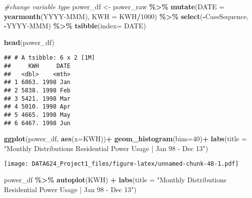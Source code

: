 \documentclass[
]{article}
\newenvironment{Shaded}{\begin{snugshade}}{\end{snugshade}}
\newcommand{\AttributeTok}[1]{\textcolor[rgb]{0.13,0.29,0.53}{#1}}
\newcommand{\CommentTok}[1]{\textcolor[rgb]{0.56,0.35,0.01}{\textit{#1}}}
\newcommand{\DecValTok}[1]{\textcolor[rgb]{0.00,0.00,0.81}{#1}}
\newcommand{\FunctionTok}[1]{\textcolor[rgb]{0.13,0.29,0.53}{\textbf{#1}}}
\newcommand{\NormalTok}[1]{#1}
\newcommand{\OtherTok}[1]{\textcolor[rgb]{0.56,0.35,0.01}{#1}}
\newcommand{\SpecialCharTok}[1]{\textcolor[rgb]{0.81,0.36,0.00}{\textbf{#1}}}
\newcommand{\StringTok}[1]{\textcolor[rgb]{0.31,0.60,0.02}{#1}}
\begin{document}
\begin{Shaded}
\begin{Highlighting}[]
\CommentTok{\#change variable type }
\NormalTok{power\_df }\OtherTok{\textless{}{-}}\NormalTok{ power\_raw }\SpecialCharTok{\%\textgreater{}\%} 
  \FunctionTok{mutate}\NormalTok{(}\AttributeTok{DATE =} \FunctionTok{yearmonth}\NormalTok{(}\StringTok{\textasciigrave{}}\AttributeTok{YYYY{-}MMM}\StringTok{\textasciigrave{}}\NormalTok{), }\AttributeTok{KWH =}\NormalTok{ KWH}\SpecialCharTok{/}\DecValTok{1000}\NormalTok{) }\SpecialCharTok{\%\textgreater{}\%}
  \FunctionTok{select}\NormalTok{(}\SpecialCharTok{{-}}\NormalTok{CaseSequence, }\SpecialCharTok{{-}}\StringTok{\textquotesingle{}YYYY{-}MMM\textquotesingle{}}\NormalTok{) }\SpecialCharTok{\%\textgreater{}\%} 
  \FunctionTok{tsibble}\NormalTok{(}\AttributeTok{index=}\NormalTok{ DATE)}
\end{Highlighting}
\end{Shaded}

\begin{Shaded}
\begin{Highlighting}[]
\FunctionTok{head}\NormalTok{(power\_df)}
\end{Highlighting}
\end{Shaded}

\begin{verbatim}
## # A tsibble: 6 x 2 [1M]
##     KWH     DATE
##   <dbl>    <mth>
## 1 6863. 1998 Jan
## 2 5838. 1998 Feb
## 3 5421. 1998 Mar
## 4 5010. 1998 Apr
## 5 4665. 1998 May
## 6 6467. 1998 Jun
\end{verbatim}

\begin{Shaded}
\begin{Highlighting}[]
\FunctionTok{ggplot}\NormalTok{(power\_df, }\FunctionTok{aes}\NormalTok{(}\AttributeTok{x=}\NormalTok{KWH))}\SpecialCharTok{+}
  \FunctionTok{geom\_histogram}\NormalTok{(}\AttributeTok{bins=}\DecValTok{40}\NormalTok{)}\SpecialCharTok{+}
  \FunctionTok{labs}\NormalTok{(}\AttributeTok{title =} \StringTok{"Monthly Distributions Residential Power Usage | Jan \textquotesingle{}98 {-} Dec \textquotesingle{}13"}\NormalTok{)}
\end{Highlighting}
\end{Shaded}

\texttt{[image: DATA624\_Project1\_files/figure-latex/unnamed-chunk-48-1.pdf]}

\begin{Shaded}
\begin{Highlighting}[]
\NormalTok{power\_df }\SpecialCharTok{\%\textgreater{}\%}
  \FunctionTok{autoplot}\NormalTok{(KWH) }\SpecialCharTok{+}
  \FunctionTok{labs}\NormalTok{(}\AttributeTok{title =} \StringTok{"Monthly Distributions Residential Power Usage | Jan \textquotesingle{}98 {-} Dec \textquotesingle{}13"}\NormalTok{)}
\end{Highlighting}
\end{Shaded}
\end{document}
